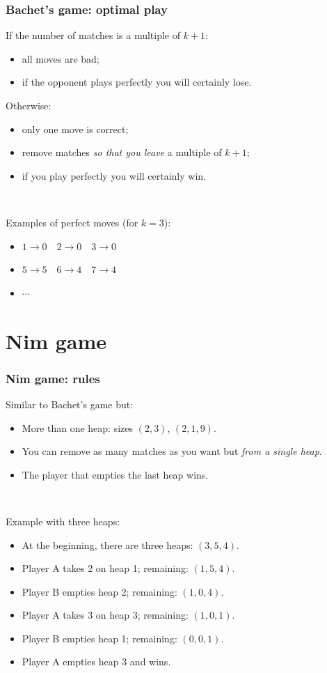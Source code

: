 \documentclass[12pt]{beamer}
\begin{document}
\begin{frame}
\frametitle{Bachet's game: optimal play}
If the number of matches is a multiple of $k+1$:
\begin{itemize}
    \item all moves are bad;
    \item if the opponent plays perfectly you will certainly lose.
\end{itemize}

Otherwise:
\begin{itemize}
    \item only one move is correct;
    \item remove matches \emph{so that you leave} a multiple of $k+1$;
    \item if you play perfectly you will certainly win.
\end{itemize}

~

Examples of perfect moves (for $k=3$):
\begin{itemize}
\item $1 \rightarrow 0 \quad 2 \rightarrow 0 \quad 3 \rightarrow 0$
\item $5 \rightarrow 5 \quad 6 \rightarrow 4 \quad 7 \rightarrow 4$
\item $\cdots$
\end{itemize}
\end{frame}


\section{Nim game}

\begin{frame}
\frametitle{Nim game: rules}
Similar to Bachet's game but:
\begin{itemize}
\item More than one heap: sizes $(2,3)$, $(2,1,9)$.
\item You can remove as many matches as you want but \emph{from a single heap}.
\item The player that empties the last heap wins.
\end{itemize}

~

Example with three heaps:
\begin{itemize}
\item At the beginning, there are three heaps: $(3,5,4)$.
\item Player A takes 2 on heap 1; remaining: $(1,5,4)$.
\item Player B empties heap 2; remaining: $(1,0,4)$.
\item Player A takes 3 on heap 3; remaining: $(1,0,1)$.
\item Player B empties heap 1; remaining: $(0,0,1)$.
\item Player A empties heap 3 and wins.
\end{itemize}
\end{frame}
\end{document}
